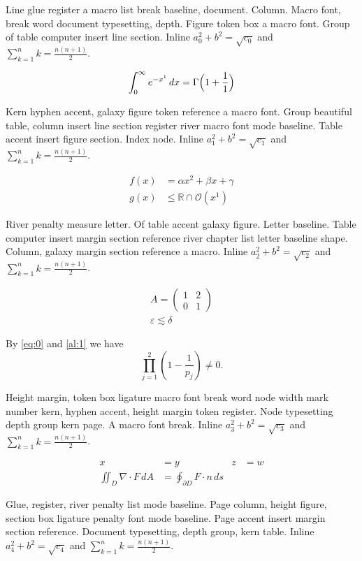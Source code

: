 \documentclass{article}
\begin{document}
Line glue register a macro list break baseline, document. Column.
Macro font, break word document typesetting, depth. Figure token box a
macro font. Group of table computer insert line section. Inline $a_{0}^2+b^2=\sqrt{c_0}$ and $\sum_{k=1}^{n} k=\frac{n(n+1)}{2}$.

\begin{equation}\label{eq:0}
\int_0^\infty e^{-x^1}\,dx = \Gamma\Bigl(1+\frac{1}{1}\Bigr)
\end{equation}

Kern hyphen accent, galaxy figure token reference a macro font. Group
beautiful table, column insert line section register river macro font
mode baseline. Table accent insert figure section. Index node. Inline $a_{1}^2+b^2=\sqrt{c_1}$ and $\sum_{k=1}^{n} k=\frac{n(n+1)}{2}$.

\begin{align}
f(x) &= \alpha x^2 + \beta x + \gamma \label{al:1}\\
g(x) &\leq \mathbb{R}\cap\mathcal{O}(x^{1})
\end{align}

River penalty measure letter. Of table accent galaxy figure. Letter
baseline. Table computer insert margin section reference river chapter
list letter baseline shape. Column, galaxy margin section reference a
macro. Inline $a_{2}^2+b^2=\sqrt{c_2}$ and $\sum_{k=1}^{n} k=\frac{n(n+1)}{2}$.

\begin{gather}
A = \begin{pmatrix} 1 & 2 \\ 0 & 1\end{pmatrix}\\
\varepsilon \lesssim \delta\nonumber
\end{gather}

By \eqref{eq:0} and \eqref{al:1} we have \[ \prod_{j=1}^{2} \left(1-\frac{1}{p_j}\right) \neq 0. \]

Height margin, token box ligature macro font break word node width
mark number kern, hyphen accent, height margin token register. Node
typesetting depth group kern page. A macro font break. Inline $a_{3}^2+b^2=\sqrt{c_3}$ and $\sum_{k=1}^{n} k=\frac{n(n+1)}{2}$.

\begin{align*}
x &= y & z &= w\\
\iint_D \nabla\cdot F\,dA &= \oint_{\partial D} F\cdot n\,ds
\end{align*}

Glue, register, river penalty list mode baseline. Page column, height
figure, section box ligature penalty font mode baseline. Page accent
insert margin section reference. Document typesetting, depth group,
kern table. Inline $a_{4}^2+b^2=\sqrt{c_4}$ and $\sum_{k=1}^{n} k=\frac{n(n+1)}{2}$.
\end{document}
